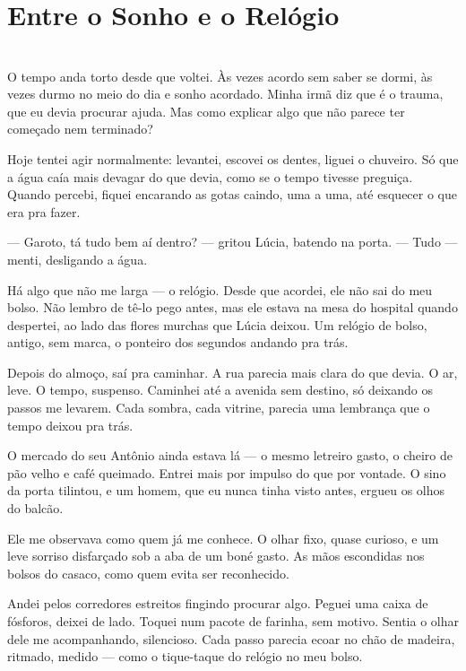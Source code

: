 \newpage

\ifdefined\useChapters
\chapter{Entre o Sonho e o Relógio}
\else
\chapter{}
\fi

O tempo anda torto desde que voltei. Às vezes acordo sem saber se dormi, às vezes durmo no meio do dia e sonho acordado. Minha irmã diz que é o trauma, que eu devia procurar ajuda. Mas como explicar algo que não parece ter começado nem terminado?

\medskip

Hoje tentei agir normalmente: levantei, escovei os dentes, liguei o chuveiro. Só que a água caía mais devagar do que devia, como se o tempo tivesse preguiça. Quando percebi, fiquei encarando as gotas caindo, uma a uma, até esquecer o que era pra fazer.

— Garoto, tá tudo bem aí dentro? — gritou Lúcia, batendo na porta.
— Tudo — menti, desligando a água.

\medskip

Há algo que não me larga — o relógio. Desde que acordei, ele não sai do meu bolso. Não lembro de tê-lo pego antes, mas ele estava na mesa do hospital quando despertei, ao lado das flores murchas que Lúcia deixou.  
Um relógio de bolso, antigo, sem marca, o ponteiro dos segundos andando pra trás.

\medskip

Depois do almoço, saí pra caminhar. A rua parecia mais clara do que devia. O ar, leve. O tempo, suspenso.  
Caminhei até a avenida sem destino, só deixando os passos me levarem. Cada sombra, cada vitrine, parecia uma lembrança que o tempo deixou pra trás.  

O mercado do seu Antônio ainda estava lá — o mesmo letreiro gasto, o cheiro de pão velho e café queimado. Entrei mais por impulso do que por vontade. O sino da porta tilintou, e um homem, que eu nunca tinha visto antes, ergueu os olhos do balcão.  

Ele me observava como quem já me conhece. O olhar fixo, quase curioso, e um leve sorriso disfarçado sob a aba de um boné gasto. As mãos escondidas nos bolsos do casaco, como quem evita ser reconhecido.  

Andei pelos corredores estreitos fingindo procurar algo.  
Peguei uma caixa de fósforos, deixei de lado. Toquei num pacote de farinha, sem motivo.  
Sentia o olhar dele me acompanhando, silencioso. Cada passo parecia ecoar no chão de madeira, ritmado, medido — como o tique-taque do relógio no meu bolso.  

